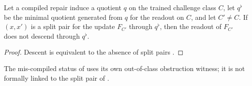 \begin{proposition}[E4: brittleness]\label{prop:e4-brittle}
Let a compiled repair induce a quotient $q$ on the trained challenge class $C$, let
$q^\flat$ be the minimal quotient generated from $q$ for the readout on $C$, and let $C' \ne C$. If
$(x, x')$ is a split pair for the update $F_{C'}$ through $q^\flat$, then the readout of $F_{C'}$
does not descend through $q^\flat$.
\end{proposition}

\begin{proof}
Descent is equivalent to the absence of split pairs \citep{Tsiokos2026FoundIV}.
\end{proof}

The mis-compiled status of  uses its own out-of-class obstruction witness; it is not
formally linked to the split pair of .

